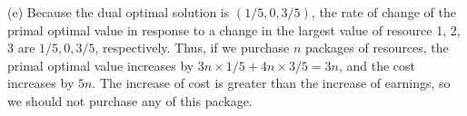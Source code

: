 \documentclass[12pt]{article}
\begin{document}
(e) Because the dual optimal solution is $(1/5,0,3/5)$, the rate of change of the primal optimal value in response to a change in the largest value of resource 1, 2, 3 are $1/5,0,3/5$, respectively. Thus, if we purchase $n$ packages of resources, the primal optimal value increases by $3n\times1/5 + 4n\times3/5 = 3n$, and the cost increases by $5n$. The increase of cost is greater than the increase of earnings, so we should not purchase any of this package.


\end{document}
